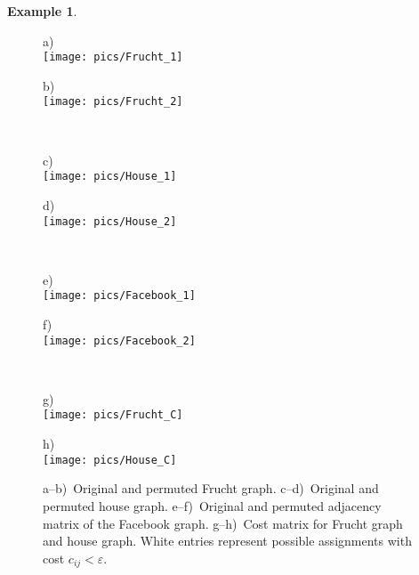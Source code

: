 \documentclass
[
    a4paper,
    DIV=11,
    abstracton
]
{scrartcl}
\newcommand{\subfiguretitle}[1]{{\scriptsize{#1}} \\[1ex]}
\theoremstyle{definition}
\newtheorem{example}[theorem]{Example}
\begin{document}
\begin{example}
\begin{figure}[htbp]
    \centering
    \begin{minipage}[t]{0.45\textwidth}
        \centering
        \subfiguretitle{a)}
        \texttt{[image: pics/Frucht\_1]}
    \end{minipage}
    \begin{minipage}[t]{0.45\textwidth}
        \centering
        \subfiguretitle{b)}
        \texttt{[image: pics/Frucht\_2]}
    \end{minipage} \\[1ex]
    
    \begin{minipage}[t]{0.45\textwidth}
        \centering
        \subfiguretitle{c)}
        \texttt{[image: pics/House\_1]}
    \end{minipage}
    \begin{minipage}[t]{0.45\textwidth}
        \centering
        \subfiguretitle{d)}
        \texttt{[image: pics/House\_2]}
    \end{minipage} \\[1ex]
    
    \begin{minipage}[t]{0.45\textwidth}
        \centering
        \subfiguretitle{e)}
        \texttt{[image: pics/Facebook\_1]}
    \end{minipage}
    \begin{minipage}[t]{0.45\textwidth}
        \centering
        \subfiguretitle{f)}
        \texttt{[image: pics/Facebook\_2]}
    \end{minipage} \\[1ex]
    
    \begin{minipage}[t]{0.45\textwidth}
        \centering
        \subfiguretitle{g)}
        \texttt{[image: pics/Frucht\_C]}
    \end{minipage}
    \begin{minipage}[t]{0.45\textwidth}
        \centering
        \subfiguretitle{h)}
        \texttt{[image: pics/House\_C]}
    \end{minipage}
    \caption{a--b)~Original and permuted Frucht graph.
             c--d)~Original and permuted house graph.
             e--f)~Original and permuted adjacency matrix of the Facebook graph.
             g\protect\nobreakdash--h)~Cost matrix for Frucht graph and house graph. White entries represent possible assignments with cost $ c_{ij} < \varepsilon $.}
    \label{fig:Simple graphs}
\end{figure}

\end{example}
\end{document}
